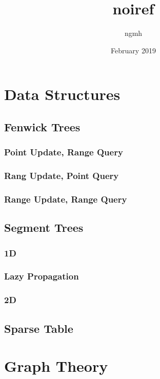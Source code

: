 \documentclass{article}
\title{noiref}
\author{ngmh}
\date{February 2019}
\begin{document}
\maketitle
\tableofcontents
\newpage

\section{Data Structures}
\subsection{Fenwick Trees}
\subsubsection{Point Update, Range Query}

\subsubsection{Rang Update, Point Query}

\subsubsection{Range Update, Range Query}


\subsection{Segment Trees}
\subsubsection{1D}

\subsubsection{Lazy Propagation}

\subsubsection{2D}


\subsection{Sparse Table}



\section{Graph Theory}
\end{document}
